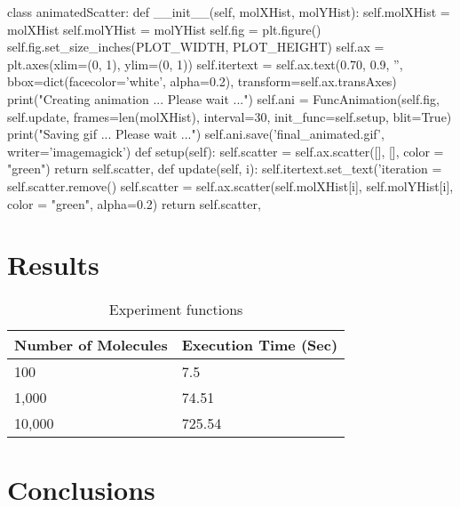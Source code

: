 \documentclass[12pt,a4paper]{article}
\begin{document}
	\begin{python}
	class animatedScatter:
		def __init__(self, molXHist, molYHist):
			self.molXHist = molXHist
			self.molYHist = molYHist
			self.fig = plt.figure()
			self.fig.set_size_inches(PLOT_WIDTH, PLOT_HEIGHT)
			self.ax = plt.axes(xlim=(0, 1), ylim=(0, 1))
			self.itertext = self.ax.text(0.70, 0.9,  '', bbox=dict(facecolor='white', alpha=0.2), transform=self.ax.transAxes)
			print("Creating animation ... Please wait ...")
			self.ani = FuncAnimation(self.fig, self.update, frames=len(molXHist), interval=30, 
			init_func=self.setup, blit=True)
			print("Saving gif ... Please wait ...")
			self.ani.save('final_animated.gif', writer='imagemagick')
			def setup(self):
			self.scatter = self.ax.scatter([], [], color = "green")
			return self.scatter,
		def update(self, i):
			self.itertext.set_text('iteration = %
			self.scatter.remove()
			self.scatter = self.ax.scatter(self.molXHist[i], self.molYHist[i], color = "green", alpha=0.2)
			return self.scatter,
	\end{python}
	
	\section{Results}\label{results}
	
	\begin{table}[!htb]
		\caption{Experiment functions} 
		\small
		\centering
		\begin{tabular}{ m{5cm} | m{5cm}}
			\toprule
			Number of Molecules & Execution Time (Sec) \\
			\midrule
			100    & 7.5 \\
			1,000  & 74.51 \\
			10,000 & 725.54 \\
			\toprule
		\end{tabular}
		\label{tab:functions}
	\end{table}
	
	\section{Conclusions}\label{conclusions}



	
	
	
\end{document}
